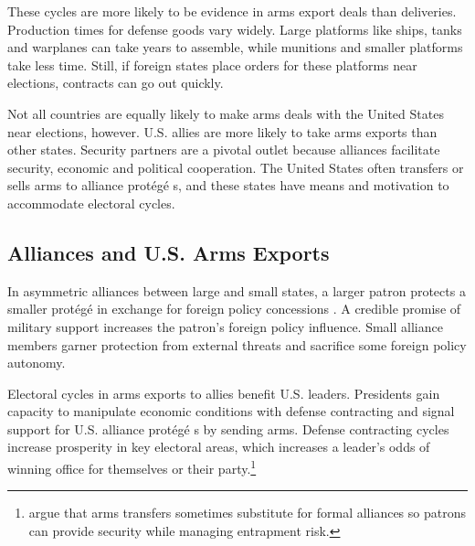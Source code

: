 \documentclass[12pt]{article}
\begin{document}
These cycles are more likely to be evidence in arms export deals than deliveries. 
Production times for defense goods vary widely. 
Large platforms like ships, tanks and warplanes can take years to assemble, while munitions and smaller platforms take less time. 
Still, if foreign states place orders for these platforms near elections, contracts can go out quickly.


Not all countries are equally likely to make arms deals with the United States near elections, however. 
U.S. allies are more likely to take arms exports than other states. 
Security partners are a pivotal outlet because alliances facilitate security, economic and political cooperation.
The United States often transfers or sells arms to alliance prot{\'e}g{\'e} s, and these states have means and motivation to accommodate electoral cycles. 



\subsection{Alliances and U.S. Arms Exports}


In asymmetric alliances between large and small states, a larger patron protects a smaller prot{\'e}g{\'e}  in exchange for foreign policy concessions \citep{Morrow1991}.
A credible promise of military support increases the patron's foreign policy influence. 
Small alliance members garner protection from external threats and sacrifice some foreign policy autonomy.



Electoral cycles in arms exports to allies benefit U.S. leaders.
Presidents gain capacity to manipulate economic conditions with defense contracting and signal support for U.S. alliance prot{\'e}g{\'e} s by sending arms.
Defense contracting cycles increase prosperity in key electoral areas, which increases a leader's odds of winning office for themselves or their party.\footnote{\citet{Yarhi-Miloetal2016} argue that arms transfers sometimes substitute for formal alliances so patrons can provide security while managing entrapment risk.}
\end{document}
